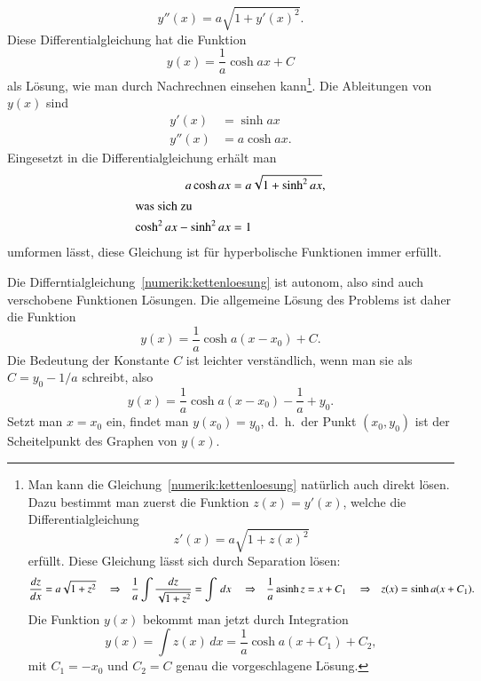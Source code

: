\begin{loesung}
\begin{equation}
y''(x)=a\sqrt{1+y'(x)^2}.
\label{numerik:kettenloesung}
\end{equation}
Diese Differentialgleichung hat die Funktion
\[
y(x) = \frac1a \cosh ax + C
\]
als Lösung, wie man durch Nachrechnen einsehen kann\footnote{
Man kann die Gleichung~\eqref{numerik:kettenloesung} natürlich auch direkt
lösen. Dazu bestimmt man zuerst die Funktion $z(x)=y'(x)$, welche die
Differentialgleichung
\[
z'(x)=a\sqrt{1+z(x)^2}
\]
erfüllt.
Diese Gleichung lässt sich durch Separation lösen:
\[
\begin{aligned}
\frac{dz}{dx}&=a\sqrt{1+z^2}
&&\Rightarrow&
\frac1a \int\frac{dz}{\sqrt{1+z^2}}&=\int \,dx
&&\Rightarrow&
\frac1a \operatorname{asinh} z &=x+C_1
&&\Rightarrow&
z(x)=\sinh a(x+C_1).
\end{aligned}
\]
Die Funktion $y(x)$ bekommt man jetzt durch Integration
\[
y(x)=\int z(x)\,dx = \frac1a \cosh a(x+C_1) + C_2,
\]
mit $C_1 = -x_0$ und $C_2=C$ genau die vorgeschlagene Lösung.
}.
Die Ableitungen von $y(x)$ sind
\begin{align*}
y' (x) &=  \sinh ax\\
y''(x) &= a\cosh ax.
\end{align*}
Eingesetzt in die Differentialgleichung erhält man
\begin{align*}
a\cosh ax&=a\sqrt{1+\sinh^2 ax},
\\
\intertext{was sich zu}
\cosh^2ax-\sinh^2ax&=1
\end{align*}
umformen lässt, diese Gleichung ist für hyperbolische Funktionen
immer erfüllt.

Die Differntialgleichung~\eqref{numerik:kettenloesung}
ist autonom, also sind auch verschobene Funktionen Lösungen.
Die allgemeine Lösung des Problems ist daher die Funktion
\begin{equation}
y(x)=\frac1a\cosh a(x-x_0) + C.
\label{numerik:ketteaC}
\end{equation}
Die Bedeutung der Konstante $C$ ist leichter verständlich, wenn man sie
als $C=y_0-1/a$ schreibt, also
\[
y(x)=\frac1a\cosh a(x-x_0) -\frac1a+y_0.
\]
Setzt man $x=x_0$ ein, findet man $y(x_0)=y_0$, d.~h.~der Punkt $(x_0,y_0)$
ist der Scheitelpunkt des Graphen von $y(x)$.


\end{loesung}
